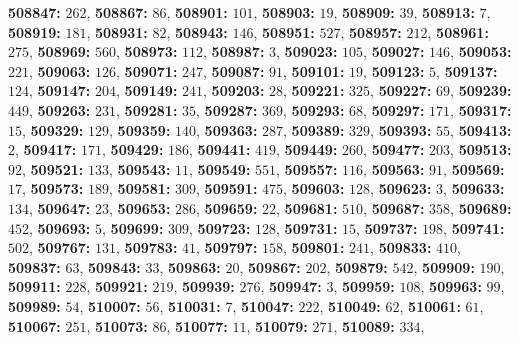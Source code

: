 \textsf{\bfseries 508847:} $262$, \textsf{\bfseries 508867:} $86$, \textsf{\bfseries 508901:} $101$, \textsf{\bfseries 508903:} $19$, \textsf{\bfseries 508909:} $39$, \textsf{\bfseries 508913:} $7$, \textsf{\bfseries 508919:} $181$, \textsf{\bfseries 508931:} $82$, \textsf{\bfseries 508943:} $146$, \textsf{\bfseries 508951:} $527$, \textsf{\bfseries 508957:} $212$, \textsf{\bfseries 508961:} $275$, \textsf{\bfseries 508969:} $560$, \textsf{\bfseries 508973:} $112$, \textsf{\bfseries 508987:} $3$, \textsf{\bfseries 509023:} $105$, \textsf{\bfseries 509027:} $146$, \textsf{\bfseries 509053:} $221$, \textsf{\bfseries 509063:} $126$, \textsf{\bfseries 509071:} $247$, \textsf{\bfseries 509087:} $91$, \textsf{\bfseries 509101:} $19$, \textsf{\bfseries 509123:} $5$, \textsf{\bfseries 509137:} $124$, \textsf{\bfseries 509147:} $204$, \textsf{\bfseries 509149:} $241$, \textsf{\bfseries 509203:} $28$, \textsf{\bfseries 509221:} $325$, \textsf{\bfseries 509227:} $69$, \textsf{\bfseries 509239:} $449$, \textsf{\bfseries 509263:} $231$, \textsf{\bfseries 509281:} $35$, \textsf{\bfseries 509287:} $369$, \textsf{\bfseries 509293:} $68$, \textsf{\bfseries 509297:} $171$, \textsf{\bfseries 509317:} $15$, \textsf{\bfseries 509329:} $129$, \textsf{\bfseries 509359:} $140$, \textsf{\bfseries 509363:} $287$, \textsf{\bfseries 509389:} $329$, \textsf{\bfseries 509393:} $55$, \textsf{\bfseries 509413:} $2$, \textsf{\bfseries 509417:} $171$, \textsf{\bfseries 509429:} $186$, \textsf{\bfseries 509441:} $419$, \textsf{\bfseries 509449:} $260$, \textsf{\bfseries 509477:} $203$, \textsf{\bfseries 509513:} $92$, \textsf{\bfseries 509521:} $133$, \textsf{\bfseries 509543:} $11$, \textsf{\bfseries 509549:} $551$, \textsf{\bfseries 509557:} $116$, \textsf{\bfseries 509563:} $91$, \textsf{\bfseries 509569:} $17$, \textsf{\bfseries 509573:} $189$, \textsf{\bfseries 509581:} $309$, \textsf{\bfseries 509591:} $475$, \textsf{\bfseries 509603:} $128$, \textsf{\bfseries 509623:} $3$, \textsf{\bfseries 509633:} $134$, \textsf{\bfseries 509647:} $23$, \textsf{\bfseries 509653:} $286$, \textsf{\bfseries 509659:} $22$, \textsf{\bfseries 509681:} $510$, \textsf{\bfseries 509687:} $358$, \textsf{\bfseries 509689:} $452$, \textsf{\bfseries 509693:} $5$, \textsf{\bfseries 509699:} $309$, \textsf{\bfseries 509723:} $128$, \textsf{\bfseries 509731:} $15$, \textsf{\bfseries 509737:} $198$, \textsf{\bfseries 509741:} $502$, \textsf{\bfseries 509767:} $131$, \textsf{\bfseries 509783:} $41$, \textsf{\bfseries 509797:} $158$, \textsf{\bfseries 509801:} $241$, \textsf{\bfseries 509833:} $410$, \textsf{\bfseries 509837:} $63$, \textsf{\bfseries 509843:} $33$, \textsf{\bfseries 509863:} $20$, \textsf{\bfseries 509867:} $202$, \textsf{\bfseries 509879:} $542$, \textsf{\bfseries 509909:} $190$, \textsf{\bfseries 509911:} $228$, \textsf{\bfseries 509921:} $219$, \textsf{\bfseries 509939:} $276$, \textsf{\bfseries 509947:} $3$, \textsf{\bfseries 509959:} $108$, \textsf{\bfseries 509963:} $99$, \textsf{\bfseries 509989:} $54$, \textsf{\bfseries 510007:} $56$, \textsf{\bfseries 510031:} $7$, \textsf{\bfseries 510047:} $222$, \textsf{\bfseries 510049:} $62$, \textsf{\bfseries 510061:} $61$, \textsf{\bfseries 510067:} $251$, \textsf{\bfseries 510073:} $86$, \textsf{\bfseries 510077:} $11$, \textsf{\bfseries 510079:} $271$, \textsf{\bfseries 510089:} $334$, 
